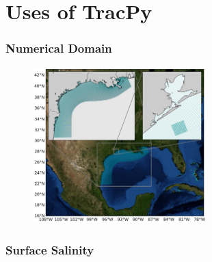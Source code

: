 \documentclass[ignorenonframetext]{beamer}
\begin{document}

    




\section{Uses of TracPy}


\begin{frame}[t]\frametitle{Numerical Domain}
	\begin{figure}[htbp]
		\centering
		\includegraphics[width=0.6\textwidth]{figures/TXLA_domain.png}
	\end{figure}
\end{frame}


\begin{frame}[t]\frametitle{Surface Salinity}
	\begin{figure}
	  	\centering
	\end{figure}
\end{frame}
\end{document}
